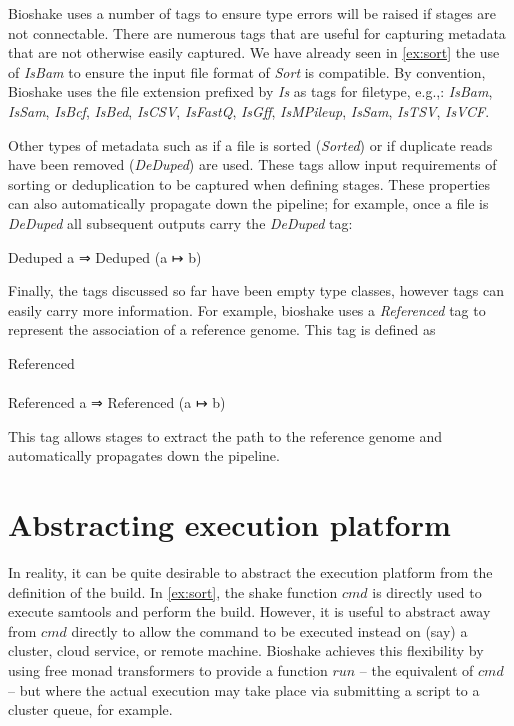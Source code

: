 \documentclass{article}
\begin{document}
Bioshake uses a number of tags to ensure type errors will be raised if stages
are not connectable. There are numerous tags that are useful for capturing
metadata that are not otherwise easily captured. We have already seen in
\cref{ex:sort} the use of \textit{IsBam} to ensure the input file format of
\textit{Sort} is compatible. By convention, Bioshake uses the file extension
prefixed by \textit{Is} as tags for filetype, e.g.,: \textit{IsBam},
\textit{IsSam}, \textit{IsBcf}, \textit{IsBed}, \textit{IsCSV},
\textit{IsFastQ}, \textit{IsGff}, \textit{IsMPileup}, \textit{IsSam},
\textit{IsTSV}, \textit{IsVCF}.

Other types of metadata such as if a file is sorted (\textit{Sorted}) or if
duplicate reads have been removed (\textit{DeDuped}) are used. These tags allow
input requirements of sorting or deduplication to be captured when defining
stages. These properties can also automatically propagate down the pipeline; for
example, once a file is \textit{DeDuped} all subsequent outputs carry the
\textit{DeDuped} tag:
\begin{haskell*}
   Deduped a ⇒ Deduped (a ↦ b)
\end{haskell*}

Finally, the tags discussed so far have been empty type classes, however tags
can easily carry more information. For example, bioshake uses a
\textit{Referenced} tag to represent the association of a reference genome. This
tag is defined as
\begin{haskell*}
   Referenced \\\\
   Referenced a ⇒ Referenced (a ↦ b)
\end{haskell*}
This tag allows stages to extract the path to the reference genome and
automatically propagates down the pipeline.

\section{Abstracting execution platform}

In reality, it can be quite desirable to abstract the execution platform from
the definition of the build. In \cref{ex:sort}, the shake function $cmd$ is
directly used to execute samtools and perform the build. However, it is useful
to abstract away from $cmd$ directly to allow the command to be executed instead
on (say) a cluster, cloud service, or remote machine. Bioshake achieves this
flexibility by using free monad transformers to provide a function $run$ -- the
equivalent of $cmd$ -- but where the actual execution may take place via
submitting a script to a cluster queue, for example.
\end{document}
